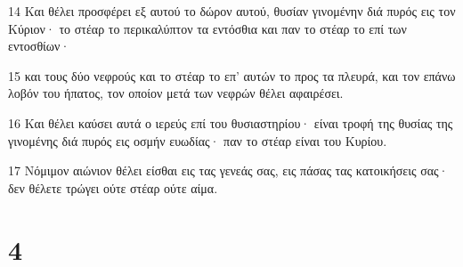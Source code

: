 \par 14 Και θέλει προσφέρει εξ αυτού το δώρον αυτού, θυσίαν γινομένην διά πυρός εις τον Κύριον· το στέαρ το περικαλύπτον τα εντόσθια και παν το στέαρ το επί των εντοσθίων·
\par 15 και τους δύο νεφρούς και το στέαρ το επ' αυτών το προς τα πλευρά, και τον επάνω λοβόν του ήπατος, τον οποίον μετά των νεφρών θέλει αφαιρέσει.
\par 16 Και θέλει καύσει αυτά ο ιερεύς επί του θυσιαστηρίου· είναι τροφή της θυσίας της γινομένης διά πυρός εις οσμήν ευωδίας· παν το στέαρ είναι του Κυρίου.
\par 17 Νόμιμον αιώνιον θέλει είσθαι εις τας γενεάς σας, εις πάσας τας κατοικήσεις σας· δεν θέλετε τρώγει ούτε στέαρ ούτε αίμα.

\chapter{4}

